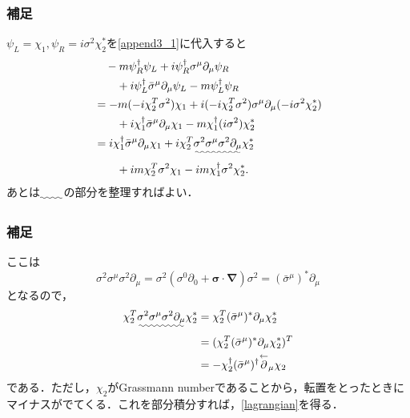 \documentclass[pdflatex,unicode,ja=standard,12pt]{beamer}
\begin{document}
\begin{frame}[noframenumbering]

  \frametitle{補足\ \subsecname}
  \thispagestyle{empty}

  $\psi_{L}=\chi_1,\psi_{R}=i\sigma^2\chi_2^*$を\eqref{append3_1}に代入すると
  \begin{align}
    &\quad    
    -m\psi_{R}^{\dag}\psi_{L}
    +
    i\psi_{R}^{\dag}\sigma^{\mu}\partial_{\mu}\psi_{R}
    \nonumber
    \\
    &\qquad
    +
    i\psi_{L}^{\dag}\bar{\sigma}^{\mu}\partial_{\mu}\psi_{L}
    -
    m\psi_{L}^{\dag}\psi_{R}
    \nonumber
    \\
    &=
    -m(-i\chi_2^T\sigma^2)\chi_1+i(-i\chi_2^T\sigma^2)\sigma^{\mu}\partial_{\mu}(-i\sigma^2\chi_2^*)
    \nonumber
    \\
    &\qquad
    +
    i\chi_1^{\dag}
    \bar{\sigma}^{\mu}\partial_{\mu}\chi_1
    -
    m\chi_1^{\dag}(i\sigma^2)\chi_2^*
    \nonumber
    \\
    &=
    i\chi_1^{\dag}\bar{\sigma}^{\mu}\partial_{\mu}\chi_1
    +
    i\chi_2^T\uwave{\sigma^2\sigma^{\mu}\sigma^2\partial_{\mu}}\chi_2^*
    \nonumber
    \\
    &\qquad
    +
    im\chi_2^T\sigma^2\chi_1
    -
    im\chi_1^{\dag}\sigma^2\chi_2^*
    .
    \label{append3_2}
  \end{align}
  あとは$\uwave{\qquad}$の部分を整理すればよい．

\end{frame}

\begin{frame}[noframenumbering]

  \frametitle{補足\ \subsecname}
  \thispagestyle{empty}

  ここは
  \begin{equation}
    \sigma^2\sigma^{\mu}\sigma^2\partial_{\mu}
    =
    \sigma^2(\sigma^{0}\partial_{0}+\bm{\sigma}\cdot\bm{\nabla})\sigma^2
    =
    (\bar{\sigma}^{\mu})^*\partial_{\mu}
  \end{equation}
  となるので，
  \begin{align}
    \chi_2^T
    \uwave{
      \sigma^2\sigma^{\mu}\sigma^2\partial_{\mu}
    }
    \chi_2^*
    &=
    \chi_2^T
    (\bar{\sigma}^{\mu})^*\partial_{\mu}
    \chi_2^*
    \nonumber
    \\
    &=
    (
      \chi_2^T
      (\bar{\sigma}^{\mu})^*\partial_{\mu}
      \chi_2^*
    )^{T}
    \nonumber
    \\
    &=
    -
    \chi_2^{\dag}(\bar{\sigma}^{\mu})^{\dag}\overset{\leftarrow}{\partial}_{\mu}\chi_2
  \end{align}
  である．ただし，$\chi_2$がGrassmann numberであることから，転置をとったときにマイナスがでてくる．これを部分積分すれば，\eqref{lagrangian}を得る．

\end{frame}
\end{document}
